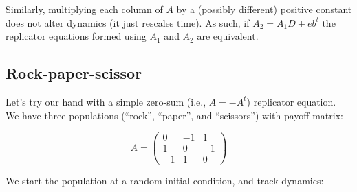 \documentclass[
]{book}
\begin{document}
Similarly, multiplying each column of \(A\) by a (possibly different) positive constant does not alter dynamics (it just rescales time). As such, if \(A_2 = A_1 D + eb^t\) the replicator equations formed using \(A_1\) and \(A_2\) are equivalent.

\hypertarget{rock-paper-scissor}{%
\subsection{Rock-paper-scissor}\label{rock-paper-scissor}}

Let's try our hand with a simple zero-sum (i.e., \(A = -A^t\)) replicator equation. We have three populations (``rock'', ``paper'', and ``scissors'') with payoff matrix:

\[
A = \begin{pmatrix}
0 & -1 & 1\\
1 & 0 & -1\\
-1 & 1 & 0
\end{pmatrix}
\]

We start the population at a random initial condition, and track dynamics:
\end{document}
